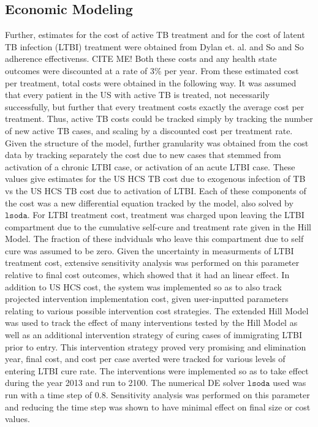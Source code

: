 \documentclass{amsart}
\begin{document}
\subsection{Economic Modeling}
Further, estimates for the cost of active TB treatment and for the cost of
latent TB infection (LTBI) treatment were obtained from Dylan et. al. and So and
So adherence effectivenss. CITE ME!
Both these costs and any health state outcomes were discounted at a rate of 3\%
per year. From these estimated cost per treatment, total costs were obtained in
the following way. It was assumed that every patient in the US with active TB is
treated, not necessarily successfully, but further that every treatment costs
exactly the average cost per treatment. Thus, active TB costs could be tracked
simply by tracking the number of new active TB cases, and scaling by a
discounted cost per treatment rate. Given the structure of the model, further
granularity was obtained from the cost data by tracking separately the cost due
to new cases that stemmed from activation of a chronic LTBI case, or activation
of an acute LTBI case. These values give estimates for the US HCS TB cost due to
exogenous infection of TB vs the US HCS TB cost due to activation of LTBI. Each
of these components of the cost was a new differential equation tracked by the
model, also solved by $\texttt{lsoda}$. For LTBI treatment cost, treatment was
charged upon leaving the LTBI compartment due to the cumulative self-cure and
treatment rate given in the Hill Model. The fraction of these indviduals who
leave this compartment due to self cure was assumed to be zero. Given the
uncertainty in measurments of LTBI treatment cost, extensive sensitivity
analysis was performed on this parameter relative to final cost outcomes, which
showed that it had an linear effect. In addition to US HCS cost, the system
was implemented so as to also track projected intervention implementation cost,
given user-inputted parameters relating to various possible intervention cost
strategies. The extended Hill Model was used to track the effect of many
interventions tested by the Hill Model as well as an additional intervention
strategy of curing cases of immigrating LTBI prior to entry. This intervention
strategy proved very promising and elimination year, final cost, and cost per
case averted were tracked for various levels of entering LTBI cure rate. The
interventions were implemented so as to take effect during the year 2013 and run
to 2100. The numerical DE solver $\texttt{lsoda}$ used was run with a time step
of $0.8$. Sensitivity analysis was performed on this parameter and reducing the
time step was shown to have minimal effect on final size or cost values. 
\end{document}
